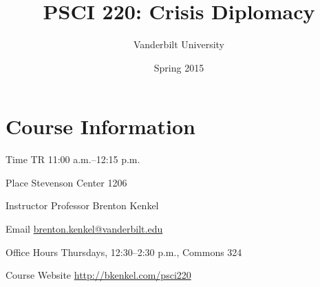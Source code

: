 \documentclass[nohyper]{tufte-handout}
\title{PSCI 220: Crisis Diplomacy}
\author{Vanderbilt University}
\date{Spring 2015}
\begin{document}
\maketitle

\section{Course Information}

\begin{compactdesc}
  \item[Time] TR 11:00 a.m.--12:15 p.m.
  \item[Place] Stevenson Center 1206
  \item[Instructor] Professor Brenton Kenkel
  \begin{compactdesc}
    \item[Email] \href{mailto:brenton.kenkel@vanderbilt.edu}{brenton.kenkel@vanderbilt.edu}
    \item[Office Hours] Thursdays, 12:30--2:30 p.m., Commons 324
  \end{compactdesc}
  \item[Course Website] \url{http://bkenkel.com/psci220}
\end{compactdesc}


\end{document}
